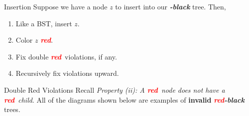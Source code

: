 \documentclass[aspectratio=169]{beamer}
\newcommand{\textib}[1]{\textit{\textbf{{#1}}}}
\newcommand{\red}{\textib{\textcolor{red}{red}}}
\begin{document}
\begin{frame}{Insertion}
    Suppose we have a node $z$ to insert into our \textib{\color{red}{red}}\textib{-black} tree. Then,
    \begin{enumerate}[label=\textit{(\roman*)}]
        \item<2-> Like a BST, insert $z$.
        \item<3-> Color $z$ \red.
        \item<4-> Fix double \red \ violations, if any.
        \item<5-> Recursively fix violations upward.
    \end{enumerate}
\end{frame}


\begin{frame}[fragile]{Double Red Violations}
    Recall \textit{Property (ii): A \red \ node does not have a \red \ child}. All of the diagrams
    shown below are examples of \textbf{invalid} \red\textib{-black} trees.
    \doublered
\end{frame}
\end{document}
